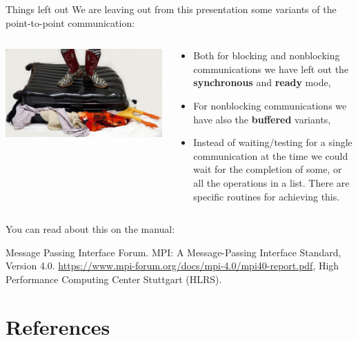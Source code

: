 \documentclass[xcolor={svgnames,usenames}]{beamer}
\begin{document}
\begin{frame}{Things left out}
We are leaving out from this presentation some variants of the point-to-point communication:
\begin{columns}
\begin{column}{0.4\columnwidth}
\centering
\includegraphics[width=\columnwidth]{fullsuitcase.jpg}
\end{column}
\begin{column}{0.6\columnwidth}
\begin{itemize}
\item Both for blocking and nonblocking communications we have left out the \textbf{synchronous} and \textbf{ready} mode,
\item For nonblocking communications we have also the \textbf{buffered} variants,
\item Instead of waiting/testing for a single communication at the time we could wait for the completion of some, or all the operations
in a list. There are specific routines for achieving this.
\end{itemize}
\end{column}

\end{columns}
\vfill
You can read about this on the manual:
\begin{thebibliography}{10}
  \footnotesize Message Passing Interface Forum. MPI: A Message-Passing Interface Standard, Version 4.0. \url{https://www.mpi-forum.org/docs/mpi-4.0/mpi40-report.pdf}, High Performance Computing Center Stuttgart (HLRS).
\end{thebibliography}


\end{frame}

\section{References}
\end{document}
